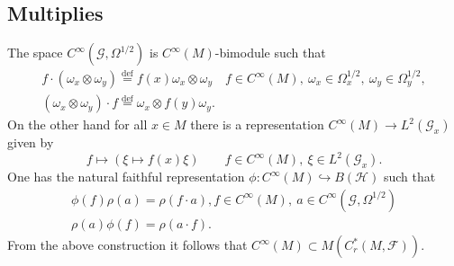 \documentclass{beamer}
\theoremstyle{plain}
\newcommand{\be}{\begin{equation}}
\newcommand{\ee}{\end{equation}}
\newcommand{\Om}{\Omega}
\newcommand{\sF}{\mathcal{F}}       %
\newcommand{\sH}{\mathcal{H}}       %
\newcommand{\bydef}{\stackrel{\mathrm{def}}{=}}
\newcommand{\hookto}{\hookrightarrow}        %
\begin{document}
\subsection{Multiplies}
\begin{frame}
	The space $C^{\infty} (\mathcal G , \Omega^{1/2})$ is $C^{\infty} \left(M\right)$-bimodule such that
	\be\nonumber
	\begin{split}
		f\cdot \left(\omega_x \otimes \omega_y \right) \bydef f\left(x \right)\omega_x \otimes \omega_y \quad f \in C^{\infty} \left(M\right),~\omega_x \in \Om^{1/2}_x, ~ \omega_y \in \Om^{1/2}_y, \\
		\left(\omega_x \otimes \omega_y \right) \cdot f \bydef \omega_x \otimes f\left(y \right)\omega_y.
	\end{split}
	\ee
	On the other hand for all $x \in M$ there is a representation $C^{\infty} \left(M\right)\to L^2\left( \mathcal G_x\right)$ given by
	$$
	f \mapsto \left( \xi \mapsto f\left( x\right)\xi \right) \quad  \quad f \in C^{\infty} \left(M\right),~\xi \in L^2\left( \mathcal G_x\right).
	$$
	One has the natural faithful representation
	$
	\phi:  C^{\infty} \left(M\right)\hookto B\left(\sH \right)
	$
	such that
	\be\nonumber
	\begin{split}
		\phi\left( f\right) \rho\left( a\right) = \rho\left(f\cdot a \right),  f \in  C^{\infty} \left(M\right), ~a \in C^{\infty} (\mathcal G , \Omega^{1/2})\\
		\rho\left( a\right) \phi\left( f\right)= \rho\left(a\cdot f \right).
	\end{split}
	\ee
	From the above construction it follows that $C^{\infty} \left(M\right)\subset M\left( C^*_r(M, \sF)\right)$. 
\end{frame}
\end{document}
